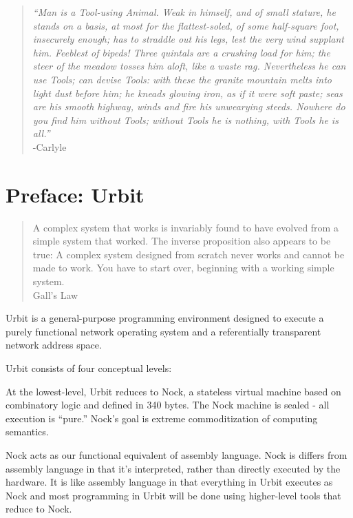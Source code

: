 \begin{quote}
\noindent \emph{``Man is a Tool-using Animal. Weak in himself, and of small stature, he stands
on a basis, at most for the flattest-soled, of some half-square foot,
insecurely enough; has to straddle out his legs, lest the very wind supplant
him. Feeblest of bipeds! Three quintals are a crushing load for him; the
steer of the meadow tosses him aloft, like a waste rag. Nevertheless he can use
Tools; can devise Tools: with these the granite mountain melts into light dust
before him; he kneads glowing iron, as if it were soft paste; seas are his
smooth highway, winds and fire his unwearying steeds. Nowhere do you find him
without Tools; without Tools he is nothing, with Tools he is all.''}
\medskip \\
\noindent -Carlyle
\end{quote}

\chapter{Preface: Urbit}

\begin{quote}
\noindent A complex system that works is invariably found to have evolved from a
simple system that worked. The inverse proposition also appears to be true:
A complex system designed from scratch never works and cannot be made to
work. You have to start over, beginning with a working simple system.
\medskip \\
Gall's Law
\end{quote}

Urbit is a general-purpose programming environment designed to execute a purely
functional network operating system and a referentially transparent network
address space.

Urbit consists of four conceptual levels:

At the lowest-level, Urbit reduces to Nock, a stateless virtual machine based
on combinatory logic and defined in 340 bytes. The Nock machine is sealed -
all execution is ``pure.'' Nock's goal is extreme commoditization of computing
semantics.

Nock acts as our functional equivalent of assembly language. Nock is differs
from assembly language in that it’s interpreted, rather than directly executed
by the hardware. It is like assembly language in that everything in Urbit
executes as Nock and most programming in Urbit will be done using higher-level
tools that reduce to Nock.

